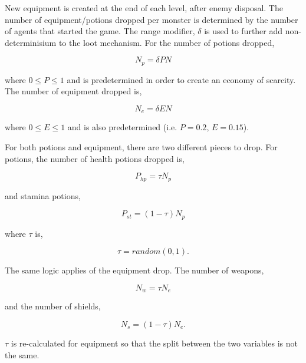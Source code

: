 New equipment is created at the end of each level, after enemy disposal. The number of equipment/potions dropped per monster is determined by the number of agents that started the game. The range modifier, $\delta$ is used to further add non-determinisium to the loot mechanism. For the number of potions dropped,

\begin{equation}
    N_p = \delta P N
\end{equation}

where $0 \leq P \leq 1$ and is predetermined in order to create an economy of scarcity. The number of equipment dropped is,

\begin{equation}
    N_e = \delta E N
\end{equation}

where $0 \leq E \leq 1$ and is also predetermined (i.e. $P=0.2$, $E=0.15$). 


\noindent For both potions and equipment, there are two different pieces to drop. For potions, the number of health potions dropped is,

\begin{equation}
    P_{hp} = \tau N_p
\end{equation}

and stamina potions,

\begin{equation}
    P_{st} = (1-\tau) N_p
\end{equation}

where $\tau$ is,

\begin{equation}
    \tau = random(0,1).
\end{equation}

\noindent The same logic applies of the equipment drop. The number of weapons,

\begin{equation}
    N_w = \tau N_e
\end{equation}

and the number of shields,

\begin{equation}
    N_s = (1 - \tau) N_e. 
\end{equation}

$\tau$ is re-calculated for equipment so that the split between the two variables is not the same. 

